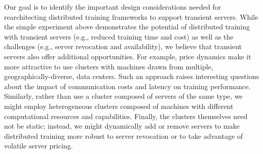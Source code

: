 Our goal is to identify the important design considerations needed for
rearchitecting distributed training frameworks to support transient servers.
While the simple experiment above demonstrates the potential of distributed
training with transient servers (e.g., reduced training time and cost) as well
as the challenges (e.g., server revocation and availability), we believe that
transient servers also offer additional opportunities.  For example, price
dynamics make it more attractive to use clusters with machines drawn from
multiple, geographically-diverse, data centers. Such an approach raises
interesting questions about the impact of communication costs and latency on
training performance. Similarly, rather than use a cluster composed of servers 
of the same type,  we might employ heterogeneous clusters composed of machines
with different computational resources and capabilities. Finally, the clusters
themselves need not be static; instead, we might dynamically add or remove
servers to make distributed training more robust to server revocation or to
take advantage of volatile server pricing.   


